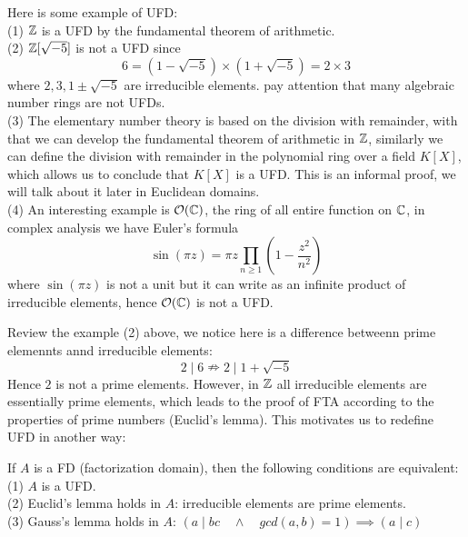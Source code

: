 \documentclass[12pt,a4paper]{article}
\begin{document}
\begin{remark}
    Here is some example of UFD:\\

    (1) \(\mathbb{Z}\) is a UFD by the fundamental theorem of arithmetic.\\ 

    (2) \(\mathbb{Z}[\sqrt{-5}]\) is not a UFD since
    \[6 = (1-\sqrt{-5})\times(1+\sqrt{-5}) = 2 \times 3\]
    where \(2,3,1\pm\sqrt{-5}\) are irreducible elements. pay attention that many algebraic number rings are not UFDs.\\

    (3) The elementary number theory is based on the division with remainder, with that we can develop the fundamental theorem of arithmetic in \(\mathbb{Z}\), similarly we can define the division with remainder in the polynomial ring over a field \(K[X]\), which allows us to conclude that \(K[X]\) is a UFD. This is an informal proof, we will talk about it later in Euclidean domains.\\

    (4) An interesting example is \(\mathcal{O}(\mathbb{C})\), the ring of all entire function on \(\mathbb{C}\), in complex analysis we have Euler's formula
    \[\sin(\pi z) = \pi z \prod_{n \geq 1}(1-\frac{z^2}{n^2})\]
    where \(\sin (\pi z)\) is not a unit but it can write as an infinite product of irreducible elements, hence \(\mathcal{O}(\mathbb{C})\) is not a UFD. 
\end{remark}

Review the example (2) above, we notice here is a difference betweenn prime elemennts annd irreducible elements:
\[2 \mid 6 \nRightarrow 2 \mid 1+\sqrt{-5}\]
Hence \(2\) is not a prime elements. However, in \(\mathbb{Z}\) all irreducible elements are essentially prime elements, which leads to the proof of FTA according to the properties of prime numbers (Euclid's lemma). This motivates us to redefine UFD in another way:

\begin{proposition}
    If \(A\) is a FD (factorization domain), then the following conditions are equivalent:\\
    (1) \(A\) is a UFD.\\
    (2) Euclid's lemma holds in \(A\): irreducible elements are prime elements. \\
    (3) Gauss's lemma holds in \(A\): \((a \mid bc \quad \land \quad gcd(a,b) =1 ) \implies (a \mid c)\)
\end{proposition}
\end{document}
